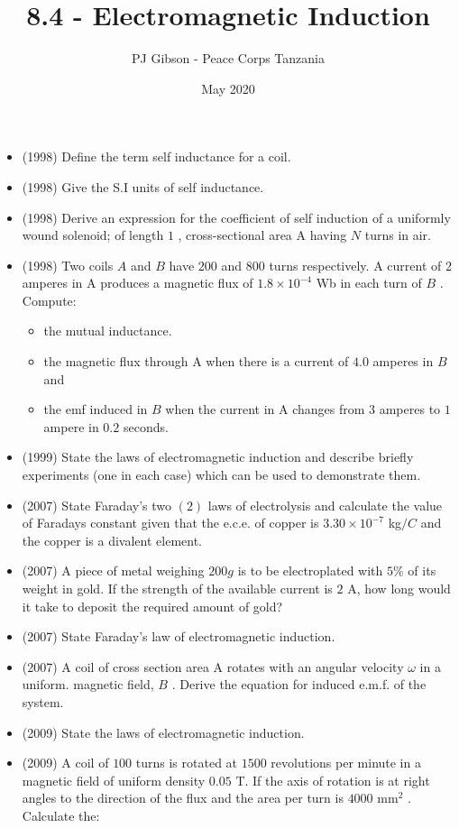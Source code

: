 \documentclass{article}
\title{\textbf{8.4 - Electromagnetic Induction}}
\author{PJ Gibson - Peace Corps Tanzania}
\date{May 2020}
\begin{document}
\maketitle

\begin{itemize}
\item (1998)  Define the term self inductance for a coil.
\item (1998)  Give the S.I units of self inductance.
\item (1998)  Derive an expression for the coefficient of self induction of a uniformly wound solenoid; of length $ 1$ , cross-sectional area A having $ N$ turns in air.
\item (1998)  Two coils $ A$ and $ B$ have $ 200$ and $ 800$ turns respectively. A current of $ 2$ amperes in A produces a magnetic flux of $ 1.8 \times 10^{-4}$ Wb in each turn of $ B$ . Compute:
 \begin{itemize}
\item the mutual inductance.
\item the magnetic flux through A when there is a current of $ 4.0$ amperes in $ B$ and
\item the emf induced in $ B$ when the current in A changes from $ 3$ amperes to $ 1$ ampere in $ 0.2$ seconds.
\end{itemize}
\item (1999)  State the laws of electromagnetic induction and describe briefly experiments (one in each case) which can be used to demonstrate them.
\item (2007)  State Faraday’s two $ (2)$ laws of electrolysis and calculate the value of Faradays constant given that the e.c.e. of copper is $ 3.30 \times 10^{-7}$ kg$/C$ and the copper is a divalent element. 
\item (2007)  A piece of metal weighing $ 200g$ is to be electroplated with $ 5\%$ of its weight in gold. If the strength of the available current is $ 2$ A, how long would it take to deposit the required amount of gold?
\item (2007)  State Faraday’s law of electromagnetic induction. 
\item (2007)  A coil of cross section area A rotates with an angular velocity $ \omega $ in a uniform. magnetic field, $ B$ . Derive the equation for induced e.m.f. of the system.
\item (2009)  State the laws of electromagnetic induction.
\item (2009)  A coil of $ 100$ turns is rotated at $ 1500$ revolutions per minute in a magnetic field of uniform density $ 0.05$ T.  If the axis of rotation is at right angles to the direction of the flux and the area per turn is $ 4000 $ mm$ ^{2}$ .  Calculate the:

\end{itemize}
\end{document}

